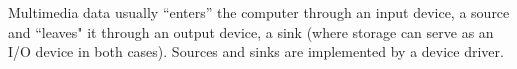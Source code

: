 Multimedia data usually ``enters'' the computer through an input device, a source and ``leaves" it through an output device, a sink (where storage can serve as an I/O
device in both cases). Sources and sinks are implemented by a device driver.
%
%
%
%	
%		
%	
%
